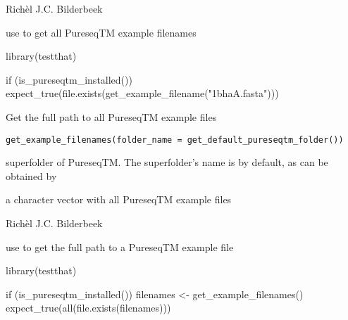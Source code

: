 \documentclass[letterpaper]{book}
\begin{document}
%
\begin{Author}\relax
Richèl J.C. Bilderbeek
\end{Author}
%
\begin{SeeAlso}\relax
use  to get all PureseqTM
example filenames
\end{SeeAlso}
%
\begin{Examples}
\begin{ExampleCode}
library(testthat)

if (is_pureseqtm_installed()) {
  expect_true(file.exists(get_example_filename("1bhaA.fasta")))
}
\end{ExampleCode}
\end{Examples}
%
\begin{Description}\relax
Get the full path to all PureseqTM example files
\end{Description}
%
\begin{Usage}
\begin{verbatim}
get_example_filenames(folder_name = get_default_pureseqtm_folder())
\end{verbatim}
\end{Usage}
%
\begin{Arguments}
\begin{ldescription}
\item[\code{folder\_name}] superfolder of PureseqTM.
The superfolder's name is 
by default, as can be obtained by
\end{ldescription}
\end{Arguments}
%
\begin{Value}
a character vector with all PureseqTM example files
\end{Value}
%
\begin{Author}\relax
Richèl J.C. Bilderbeek
\end{Author}
%
\begin{SeeAlso}\relax
use  to get the full
path to a PureseqTM example file
\end{SeeAlso}
%
\begin{Examples}
\begin{ExampleCode}
library(testthat)

if (is_pureseqtm_installed()) {
  filenames <- get_example_filenames()
  expect_true(all(file.exists(filenames)))
}
\end{ExampleCode}
\end{Examples}
\end{document}
